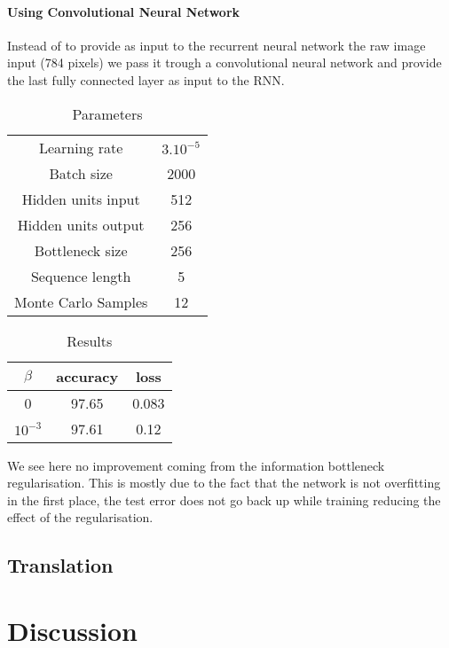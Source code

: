 \documentclass[10pt,oneside,openright]{report}
\begin{document}
\paragraph{Using Convolutional Neural Network}
Instead of to provide as input to the recurrent neural network the raw image input (784 pixels) we pass it trough a convolutional neural network and provide the last fully connected layer as input to the RNN. 

\begin {table}[H]
\begin{center}
\begin{tabular}{ c | c  }
 Learning rate & $3.10^{-5}$ \\
 Batch size & 2000\\
 Hidden units input & 512 \\
 Hidden units output & 256 \\
 Bottleneck size & 256 \\
 Sequence length & 5 \\
Monte Carlo Samples & 12\\
\end{tabular}
\end{center}
\caption{Parameters}
\end {table}

\begin {table}[H]
\begin{center}
\begin{tabular}{ c | c c }
 $\beta$  & accuracy & loss \\
 \hline
0  &  97.65 & 0.083 \\
$10^{-3}$  & 97.61& 0.12  \\
\end{tabular}
\end{center}
\caption{Results}
\end {table}

We see here no improvement coming from the information bottleneck regularisation. This is mostly due to the fact that the network is not overfitting in the first place, the test error does not go back up while training reducing the effect of the regularisation.

\subsection{Translation}

\section{Discussion}
\end{document}

